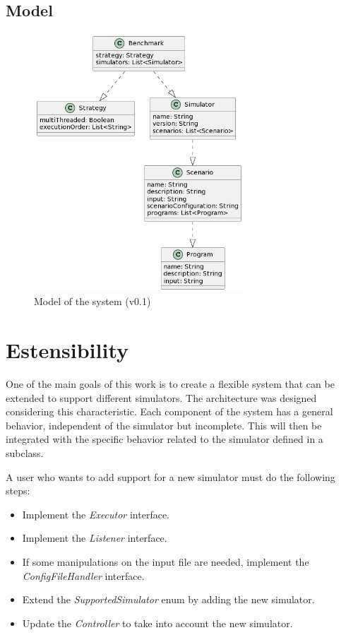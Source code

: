 \documentclass[12pt,a4paper,openright,twoside]{book}
\begin{document}
\subsection*{Model}


\begin{figure}[H]
  \centering
  \includegraphics[width=0.7\textwidth]{figures/model.png}
  \caption{Model of the system (v0.1)}
  \label{fig:model}
\end{figure}



\section{Estensibility}

One of the main goals of this work is to create a flexible system that can be extended to support different simulators.
The architecture was designed considering this characteristic. 
Each component of the system has a general behavior, independent of the simulator but incomplete. 
This will then be integrated with the specific behavior related to the simulator defined in a subclass.

A user who wants to add support for a new simulator must do the following steps:
\begin{itemize}
  \item Implement the \emph{Executor} interface.
  \item Implement the \emph{Listener} interface.
  \item If some manipulations on the input file are needed, implement the \emph{ConfigFileHandler} interface.
  \item Extend the \emph{SupportedSimulator} enum by adding the new simulator.
  \item Update the \emph{Controller} to take into account the new simulator.
\end{itemize}
\end{document}
